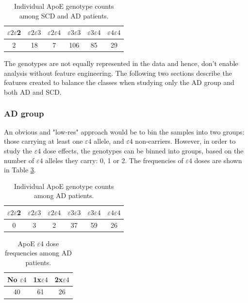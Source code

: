 \documentclass{amsart}
\theoremstyle{plain}
\begin{document}
\begin{table}[!ht]
\caption{Individual ApoE genotype counts among SCD and AD patients.} \label{Table:ApoEgenfreq}
\begin{tabular}{cccccc} \toprule
$\varepsilon2\varepsilon$2 & $\varepsilon2\varepsilon3$ & $\varepsilon2\varepsilon4$ & $\varepsilon3\varepsilon3$ & $\varepsilon3\varepsilon4$ & $\varepsilon4\varepsilon4$ \\ \midrule
2    & 18   & 7    & 106  & 85   & 29   \\ \bottomrule
\end{tabular}
\end{table}

The genotypes are not equally represented in the data and hence, don't enable analysis without feature engineering. The following two sections describe the features created to balance the classes when studying only the AD group and both AD and SCD.
\subsubsection{AD group}
An obvious and "low-res" approach would be to bin the samples into two groups: those carrying at least one $\varepsilon4$ allele, and $\varepsilon4$ non-carriers. However, in order to study the $\varepsilon4$ dose effects, the genotypes can be binned into groups, based on the number of $\varepsilon4$ alleles they carry: 0, 1 or 2. The frequencies of $\varepsilon4$ doses are shown in Table \ref{Table:E4binAD}.

\begin{table}[!ht]
\caption{Individual ApoE genotype counts among AD patients.} \label{Table:ApoEfreqAD}
\begin{tabular}{cccccc} \toprule
$\varepsilon2\varepsilon$2 & $\varepsilon2\varepsilon3$ & $\varepsilon2\varepsilon4$ & $\varepsilon3\varepsilon3$ & $\varepsilon3\varepsilon4$ & $\varepsilon4\varepsilon4$ \\ \midrule
0    & 3    & 2    & 37   & 59   & 26 \\ \bottomrule
\end{tabular}
\end{table}

\begin{table}[!ht]
\caption{ApoE $\varepsilon4$ dose frequencies among AD patients.} \label{Table:E4binAD}
\begin{tabular}{ccc} \toprule
No $\varepsilon4$  & 1x$\varepsilon4$& 2x$\varepsilon4$\\ \midrule
40    & 61   & 26 \\ \bottomrule
\end{tabular}
\end{table}
\end{document}
